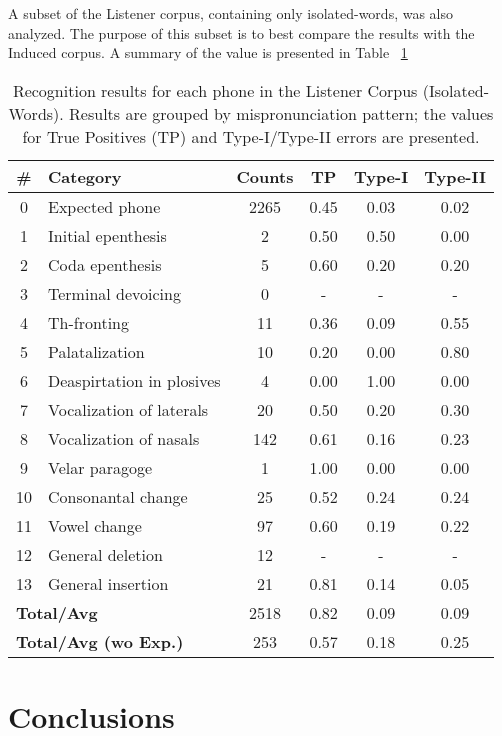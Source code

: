 \documentclass[twocolumn]{bmcart}%
\begin{document}
A subset of the Listener corpus, containing only isolated-words, was also analyzed. The purpose of this subset is to best compare the results with the Induced corpus. A summary of the value is presented in Table ~\ref{rec-listener-words}

\setlength{\tabcolsep}{0.3em}
\scriptsize
\begin{table}[ht!]
\caption{Recognition results for each phone in the Listener Corpus (Isolated-Words). Results are grouped by mispronunciation pattern; the values for True Positives (TP) and Type-I/Type-II errors are presented.}
\begin{tabular}{clcccc} \hline
\textbf{\#} & \textbf{Category} & \textbf{Counts} & \textbf{TP} & \textbf{Type-I} & \textbf{Type-II} \\ \hline
0 & Expected phone & 2265 & 0.45 & 0.03 & 0.02 \\ 
1 & Initial epenthesis & 2 & 0.50 & 0.50 & 0.00 \\ 
2 & Coda epenthesis & 5 & 0.60 & 0.20 & 0.20 \\ 
3 & Terminal devoicing & 0 & - & - & - \\ 
4 & Th-fronting & 11 & 0.36 & 0.09 & 0.55 \\ 
5 & Palatalization & 10 & 0.20 & 0.00 & 0.80 \\ 
6 & Deaspirtation in plosives & 4 & 0.00 & 1.00 & 0.00 \\ 
7 & Vocalization of laterals & 20 & 0.50 & 0.20 & 0.30 \\ 
8 & Vocalization of nasals & 142 & 0.61 & 0.16 & 0.23 \\ 
9 & Velar paragoge & 1 & 1.00 & 0.00 & 0.00 \\ 
10 & Consonantal change & 25 & 0.52 & 0.24 & 0.24 \\ 
11 & Vowel change & 97 & 0.60 & 0.19 & 0.22 \\ 
12 & General deletion & 12 & - & - & - \\ 
13 & General insertion & 21 & 0.81 & 0.14 & 0.05 \\ \hline 
\multicolumn{2}{l}{\textbf{Total/Avg}} & 2518 & 0.82 & 0.09 & 0.09 \\ 
\multicolumn{2}{l}{\textbf{Total/Avg (wo Exp.)}} & 253 & 0.57 & 0.18 & 0.25 \\ \hline
\end{tabular}
\label{rec-listener-words}
\end{table}

\section*{Conclusions}
\end{document}

